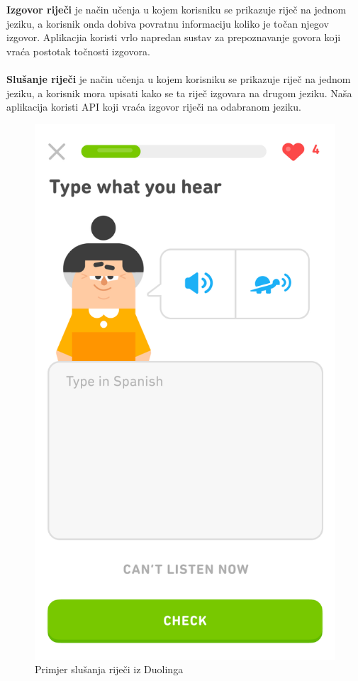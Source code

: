 		\textbf{Izgovor riječi} je način učenja u kojem korisniku se prikazuje riječ na jednom jeziku, a korisnik onda dobiva povratnu informaciju koliko je točan njegov izgovor. Aplikacjia koristi vrlo napredan sustav za prepoznavanje govora koji vraća postotak točnosti izgovora.
		\\
		\\
		\textbf{Slušanje riječi} je način učenja u kojem korisniku se prikazuje riječ na jednom jeziku, a korisnik mora upisati kako se ta riječ izgovara na drugom jeziku. Naša aplikacija koristi API koji vraća izgovor riječi na odabranom jeziku.
		\begin{figure}[H]
			\centering
			\includegraphics[width=0.4\linewidth]{slike/Duolingo.png}
			\caption{Primjer slušanja riječi iz Duolinga}
			\label{fig:rijecnik}
		\end{figure}

